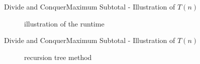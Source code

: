 


\begin{frame}{Divide and Conquer}{Maximum Subtotal - Illustration of $T(n)$}
  \begin{figure}
    \begin{adjustbox}{width=\linewidth}
      
    \end{adjustbox}
    \caption{illustration of the runtime}
    \label{fig:divide_and_conquer:max_sub_array_runtime}
  \end{figure}
\end{frame}


\begin{frame}{Divide and Conquer}{Maximum Subtotal - Illustration of $T(n)$}
  \begin{figure}
    \begin{adjustbox}{width=\linewidth}
      
    \end{adjustbox}
    \caption{recursion tree method}
    \label{fig:divide_and_conquer:max_sub_array_runtime_tree}
  \end{figure}
\end{frame}

